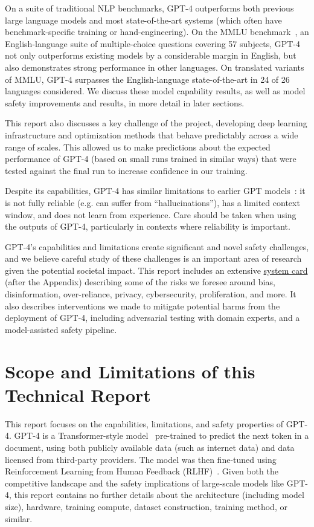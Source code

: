  On a suite of traditional NLP benchmarks, GPT-4 outperforms both previous large language models and most state-of-the-art systems (which often have benchmark-specific training or hand-engineering). On the MMLU benchmark~\citep{hendryckstest2021,hendrycks2021ethics}, an English-language suite of multiple-choice questions covering 57 subjects, GPT-4 not only outperforms existing models by a considerable margin in English, but also demonstrates strong performance in other languages. On translated variants of MMLU, GPT-4 surpasses the English-language state-of-the-art in 24 of 26 languages considered. We discuss these model capability results, as well as model safety improvements and results, in more detail in later sections. 

This report also discusses a key challenge of the project, developing deep learning infrastructure and optimization methods that behave predictably across a wide range of scales. This allowed us to make predictions about the expected performance of GPT-4 (based on small runs trained in similar ways) that were tested against the final run to increase confidence in our training. 

Despite its capabilities, GPT-4 has similar limitations to earlier GPT models~\citep{brown2020language,radford2019language,radford2018improving}: it is not fully reliable (e.g. can suffer from ``hallucinations''), has a limited context window, and does not learn from experience. Care should be taken when using the outputs of GPT-4, particularly in contexts where reliability is important. 

GPT-4's capabilities and limitations create significant and novel safety challenges, and we believe careful study of these challenges is an important area of research given the potential societal impact. This report includes an extensive \hyperref[systemcard]{system card} (after the Appendix) describing some of the risks we foresee around bias, disinformation, over-reliance, privacy, cybersecurity, proliferation, and more. It also describes interventions we made to mitigate potential harms from the deployment of GPT-4, including adversarial testing with domain experts, and a model-assisted safety pipeline.

\section{Scope and Limitations of this Technical Report}

This report focuses on the capabilities, limitations, and safety properties of GPT-4. GPT-4 is a Transformer-style model~\cite{vaswani2017attention} pre-trained to predict the next token in a document, using both publicly available data (such as internet data) and data licensed from third-party providers. The model was then fine-tuned using Reinforcement Learning from Human Feedback (RLHF)~\citep{christiano2017deep}. Given both the competitive landscape and the safety implications of large-scale models like GPT-4, this report contains no further details about the architecture (including model size), hardware, training compute, dataset construction, training method, or similar.

